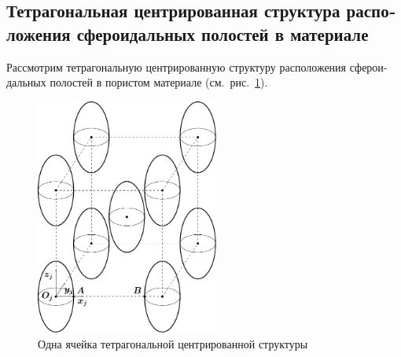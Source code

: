 \begin{russian}
\subsection{Тетрагональная центрированная структура расположения сфероидальных полостей в материале}

Рассмотрим тетрагональную центрированную структуру расположения сфероидальных полостей в пористом материале (см.~рис.~\ref{f:9:42}).

\begin{figure}[h!]
\centering
\includegraphics[width=6cm]{cav-9.pdf}
\caption{Одна ячейка тетрагональной центрированной структуры}
\label{f:9:42}
\end{figure}


\end{russian}
